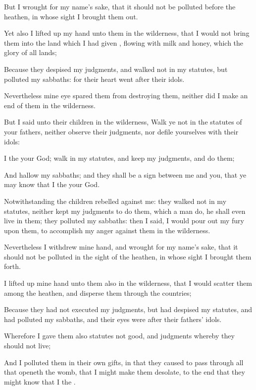 {But I
wrought for my
name’s sake, that it should not be
polluted
before the
heathen, in whose
sight I brought them
out.

Yet also I lifted
up my
hand unto them in the
wilderness, that I would not
bring them into the
land which I had
given
{},
flowing with
milk and
honey, which
{} the
glory of all
lands;

Because they
despised my
judgments, and
walked not in my
statutes, but
polluted my
sabbaths: for their
heart
went
after their
idols.

Nevertheless mine
eye
spared them from
destroying them, neither did I
make an
end of them in the
wilderness.

But I
said unto their
children in the
wilderness,
Walk ye not in the
statutes of your
fathers, neither
observe their
judgments, nor
defile yourselves with their
idols:

I
{} the
{} your
God;
walk in my
statutes, and
keep my
judgments, and
do them;

And
hallow my
sabbaths; and they shall be a
sign between me and you, that ye may
know that I
{} the
{} your
God.

Notwithstanding the
children
rebelled against me: they
walked not in my
statutes, neither
kept my
judgments to
do them, which
{} a
man
do, he shall even
live in them; they
polluted my
sabbaths: then I
said, I would pour
out my
fury upon them, to
accomplish my
anger against them in the
wilderness.

Nevertheless I
withdrew mine
hand, and
wrought for my
name’s sake, that it should not be
polluted in the
sight of the
heathen, in whose
sight I brought them
forth.

I lifted
up mine
hand unto them also in the
wilderness, that I would
scatter them among the
heathen, and
disperse them through the
countries;

Because they had not
executed my
judgments, but had
despised my
statutes, and had
polluted my
sabbaths, and their
eyes were
after their
fathers’
idols.

Wherefore I
gave them also
statutes
{} not
good, and
judgments whereby they should not
live;

And I
polluted them in their own
gifts, in that they caused to pass
through
{} all that
openeth the
womb, that I might make them
desolate, to the end that they might
know that I
{} the
{}.


}
